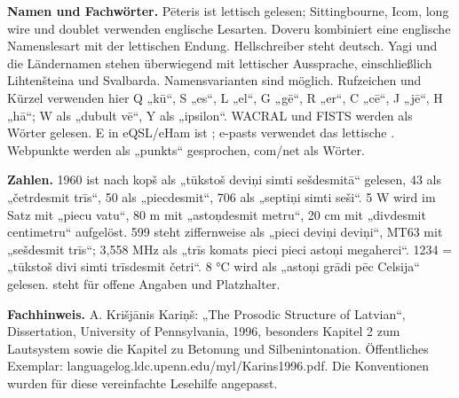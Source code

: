 \documentclass[a4paper,landscape,10pt]{article}
\newcommand{\ipa}[1]{{\ipafont[#1]}}
\begin{document}
\smallskip
\textbf{Namen und Fachwörter.} Pēteris ist lettisch gelesen; Sittingbourne, Icom, long wire und doublet
verwenden englische Lesarten. Doveru kombiniert eine englische Namenslesart mit der lettischen Endung.
Hellschreiber steht deutsch. Yagi und die Ländernamen stehen überwiegend mit lettischer Aussprache,
einschließlich Lihtenšteina und Svalbarda. Namensvarianten sind möglich.
Rufzeichen und Kürzel verwenden hier Q „kū“, S „es“, L „el“, G „gē“, R „er“, C „cē“, J „jē“, H „hā“;
W als „dubult vē“, Y als „ipsilon“. WACRAL und FISTS werden als Wörter gelesen.
E in eQSL/eHam ist \ipa{iː}; e-pasts verwendet das lettische \ipa{eː}.
Webpunkte werden als „punkts“ gesprochen, com/net als Wörter.

\smallskip
\textbf{Zahlen.} 1960 ist nach kopš als „tūkstoš deviņi simti sešdesmitā“ gelesen,
43 als „četrdesmit trīs“, 50 als „piecdesmit“, 706 als „septiņi simti seši“.
5 W wird im Satz mit „piecu vatu“, 80 m mit „astoņdesmit metru“,
20 cm mit „divdesmit centimetru“ aufgelöst.
599 steht ziffernweise als „pieci deviņi deviņi“, MT63 mit „sešdesmit trīs“;
3,558 MHz als „trīs komats pieci pieci astoņi megaherci“.
1234 = „tūkstoš divi simti trīsdesmit četri“.
8 °C wird als „astoņi grādi pēc Celsija“ gelesen. \ipa{…} steht für offene Angaben und Platzhalter.

\smallskip
\textbf{Fachhinweis.} A. Krišjānis Kariņš: „The Prosodic Structure of Latvian“, Dissertation,
University of Pennsylvania, 1996, besonders Kapitel 2 zum Lautsystem sowie die Kapitel zu Betonung und
Silbenintonation. Öffentliches Exemplar: languagelog.ldc.upenn.edu/myl/Karins1996.pdf.
Die Konventionen wurden für diese vereinfachte Lesehilfe angepasst.
\end{document}

